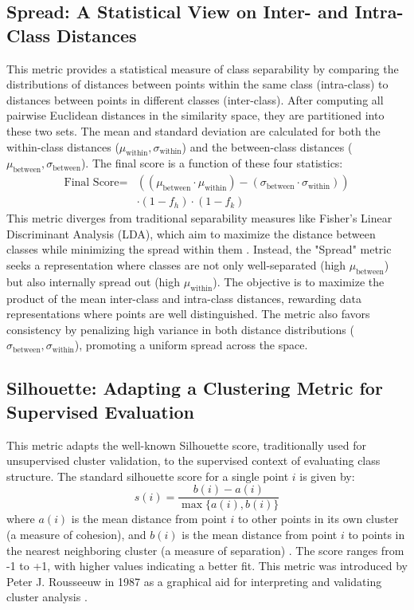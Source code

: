 \documentclass[conference]{IEEEtran}
\begin{document}
\subsection{Spread: A Statistical View on Inter- and Intra-Class Distances}
This metric provides a statistical measure of class separability by comparing the distributions of distances between points within the same class (intra-class) to distances between points in different classes (inter-class). After computing all pairwise Euclidean distances in the similarity space, they are partitioned into these two sets. The mean and standard deviation are calculated for both the within-class distances ($\mu_{\text{within}}, \sigma_{\text{within}}$) and the between-class distances ($\mu_{\text{between}}, \sigma_{\text{between}}$). The final score is a function of these four statistics:
\begin{equation}
\begin{split}
\text{Final Score} ={}& ((\mu_{\text{between}} \cdot \mu_{\text{within}}) - (\sigma_{\text{between}} \cdot \sigma_{\text{within}})) \\
& \cdot (1 - f_h) \cdot (1 - f_k)
\end{split}
\end{equation}
This metric diverges from traditional separability measures like Fisher's Linear Discriminant Analysis (LDA), which aim to maximize the distance between classes while minimizing the spread within them \cite{b34, b35, b36}. Instead, the "Spread" metric seeks a representation where classes are not only well-separated (high $\mu_{\text{between}}$) but also internally spread out (high $\mu_{\text{within}}$). The objective is to maximize the product of the mean inter-class and intra-class distances, rewarding data representations where points are well distinguished. The metric also favors consistency by penalizing high variance in both distance distributions ($\sigma_{\text{between}}, \sigma_{\text{within}}$), promoting a uniform spread across the space.

\subsection{Silhouette: Adapting a Clustering Metric for Supervised Evaluation}
This metric adapts the well-known Silhouette score, traditionally used for unsupervised cluster validation, to the supervised context of evaluating class structure. The standard silhouette score for a single point $i$ is given by:
\begin{equation}
s(i) = \frac{b(i) - a(i)}{\max\{a(i), b(i)\}}
\end{equation}
where $a(i)$ is the mean distance from point $i$ to other points in its own cluster (a measure of cohesion), and $b(i)$ is the mean distance from point $i$ to points in the nearest neighboring cluster (a measure of separation) \cite{b38}. The score ranges from -1 to +1, with higher values indicating a better fit. This metric was introduced by Peter J. Rousseeuw in 1987 as a graphical aid for interpreting and validating cluster analysis \cite{b38, b39, b40}.
\end{document}
